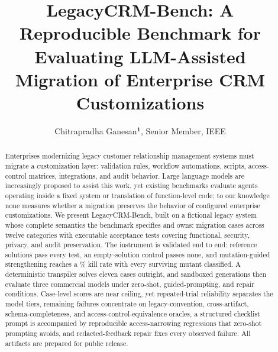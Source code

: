 \documentclass{ieeetj}
\def\authorrefmark#1{\ensuremath{^{\textbf{#1}}}}
\begin{document}


\title{LegacyCRM-Bench: A Reproducible Benchmark for Evaluating LLM-Assisted Migration of
Enterprise CRM Customizations}

\author{Chitrapradha Ganesan\authorrefmark{1}, Senior Member, IEEE}

\begin{abstract}
Enterprises modernizing legacy customer relationship management systems must migrate a
customization layer: validation rules, workflow automations, scripts, access-control
matrices, integrations, and audit behavior. Large language models are increasingly proposed
to assist this work, yet existing benchmarks evaluate agents operating inside a fixed system
or translation of function-level code; to our knowledge none measures whether a migration
preserves the behavior of configured enterprise customizations. We present LegacyCRM-Bench,
built on a fictional legacy system whose complete semantics the benchmark specifies and
owns: \NumCases{} migration cases across twelve categories with \NumTests{} executable
acceptance tests covering functional, security, privacy, and audit preservation. The
instrument is validated end to end: reference solutions pass every test, an empty-solution
control passes none, and mutation-guided strengthening reaches a \KillRate\% kill rate with
every surviving mutant classified. A deterministic transpiler solves eleven cases outright,
and \PTwoGens{} sandboxed generations then evaluate three commercial models under
zero-shot, guided-prompting, and repair conditions. Case-level scores are near ceiling, yet repeated-trial
reliability separates the model tiers, remaining failures concentrate on
legacy-convention, cross-artifact, schema-completeness, and access-control-equivalence
oracles, a structured
checklist prompt is accompanied by reproducible access-narrowing regressions that zero-shot
prompting avoids, and redacted-feedback repair fixes every observed failure. All artifacts are prepared for public release.
\end{abstract}
\end{document}
